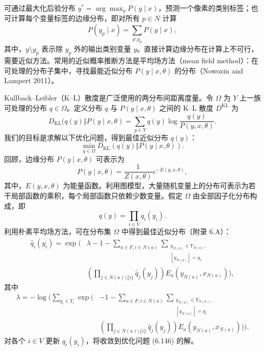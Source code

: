 
可通过最大化后验分布 $y^*=\arg\max_yP(y\mid x)$，预测一个像素的类别标签；也可计算每个变量标签的边缘分布，即对所有 $p\in N$ 计算
\begin{equation}
P(y_p\mid x)=\sum_{y\setminus y_p}P(y\mid x),
\tag{6.144}
\end{equation}
其中，$y\setminus y_p$ 表示除 $y_p$ 外的输出类别变量 $y$。直接计算边缘分布在计算上不可行，需要近似方法。常用的近似概率推断方法是平均场方法（mean field method）：在可处理的分布子集中，寻找最能近似分布 $P(y\mid x,\theta)$ 的分布（Nowozin and Lampert 2011）。

Kullback–Leibler（K–L）散度是广泛使用的两分布间距离度量。令 $\Omega$ 为 $Y$ 上一族可处理的分布 $q\in\Omega$。定义分布 $q$ 与 $P(y\mid x,\theta)$ 之间的 K–L 散度 $D^{\mathrm{KL}}$ 为
\begin{equation}
D_{\mathrm{KL}}(q(y)\Vert P(y\mid x,\theta)=\sum_{y\in Y}q(y)\log\frac{q(y)}{P(y,x,\theta)}.
\tag{6.145}
\end{equation}
我们的目标是求解以下优化问题，得到最佳近似分布 $q(y)$：
\begin{equation}
\min_{q\in\Omega}D_{\mathrm{KL}}(q(y)\Vert P(y\mid x,\theta)).
\tag{6.146}
\end{equation}
回顾，边缘分布 $P(y\mid x,\theta)$ 可表示为
\begin{equation}
P(y\mid x,\theta)=\frac1{Z(x,\theta)}e^{-E(y,x,\theta)},
\tag{6.147}
\end{equation}
其中，$E(y,x,\theta)$ 为能量函数。利用图模型，大量随机变量上的分布可表示为若干局部函数的乘积，每个局部函数只依赖少数变量。假定 $\Omega$ 由全部因子化分布构成，即
\[
q(y)=\prod_{i\in V}q_i(y_i).
\]
利用朴素平均场方法，可在分布集 $\Omega$ 中得到最佳近似分布（附录 6.A）：
\begin{equation}
\begin{aligned}
\widehat q_i(y_i)=\exp\Biggl(&\lambda-1-\sum_{a\in F,i\in N(a)}\sum_{\substack{y_{N(a)}\in Y_{N(a)},\\{}[y_{N(a)}]=y_i}}\\
&\left(\prod_{j\in N(a)\setminus\{i\}}\widehat q_j(y_j)\right)E_a(y_{N(a)},x_{N(a)})\Biggr),
\end{aligned}\tag{6.148}
\end{equation}
其中
\begin{equation}
\begin{aligned}
\lambda=-\log\Biggl(\sum_{y_i\in Y_i}\exp\Biggl(&-1-\sum_{a\in F,i\in N(a)}\sum_{\substack{y_{N(a)}\in Y_{N(a)},\\{}[y_{N(a)}]=y_i}}\\
&\left(\prod_{j\in N(a)\setminus\{i\}}\widehat q_j(y_j)\right)E_a(y_{N(a)},x_{N(a)})\Biggr)\Biggr).
\end{aligned}\tag{6.149}
\end{equation}
对各个 $i\in V$ 更新 $q_i(y_i)$，将收敛到优化问题 (6.146) 的解。

